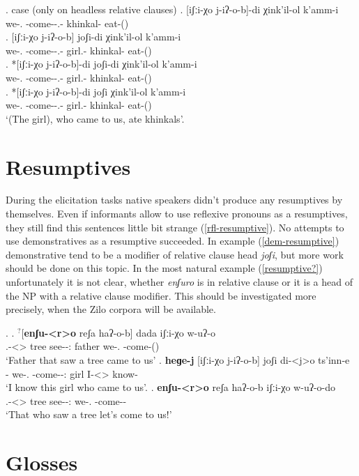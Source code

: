 \ex. case (only on headless relative clauses)
	\ag. [iʃːi-χo j-iʔ-o-b]-di χink'il-ol k'amm-i\\
			{we-\Add.\Lat} {\M-come-\Pst-\Ptcp.\Pst-\Erg} {khinkal-\Pl} {eat-\Pst(\Aor)}\\
	\bg. [iʃːi-χo j-iʔ-o-b] joʃi-di χink'il-ol k'amm-i\\
			{we-\Add.\Lat} {\M-come-\Pst-\Ptcp.\Pst-\Erg} {girl.\Obl-\Erg} {khinkal-\Pl} {eat-\Pst(\Aor)}\\
	\bg. *[iʃːi-χo j-iʔ-o-b]-di joʃi-di χink'il-ol k'amm-i\\
			{we-\Add.\Lat} {\M-come-\Pst-\Ptcp.\Pst-\Erg} {girl.\Obl-\Erg} {khinkal-\Pl} {eat-\Pst(\Aor)}\\
	\bg. *[iʃːi-χo j-iʔ-o-b]-di joʃi χink'il-ol k'amm-i\\
			{we-\Add.\Lat} {\M-come-\Pst-\Ptcp.\Pst-\Erg} {girl.\Obl-\Erg} {khinkal-\Pl} {eat-\Pst(\Aor)}\\
			\glt `(The girl), who came to us, ate khinkals'.

\section{Resumptives}
During the elicitation tasks native speakers didn't produce any resumptives by themselves. Even if informants allow to use reflexive pronouns as a resumptives, they still find this sentences little bit strange (\ref{rfl-resumptive}). No attempts to use demonstratives as a resumptive succeeded. In example (\ref{dem-resumptive}) demonstrative tend to be a modifier of relative clause head \textit{joʃi}, but more work should be done on this topic. In the most natural example (\ref{resumptive?}) unfortunately it is not clear, whether \textit{enʃuro} is in relative clause or it is a head of the NP with a relative clause modifier. This should be investigated more precisely, when the Zilo corpora will be available.

\ex.  
	\ag. $^?$[\textbf{enʃu-<r>o} reʃa haʔ-o-b] dada iʃːi-χo w-uʔ-o\\
		{\Rfl.\Obl-<\Nans>\Aff} tree {see-\Pst-\Ptcp:\Pst} father {we-\Add.\Lat} {\M-come-\Pst(\Aor)}\\
		\glt `Father that saw a tree came to us' \label{rfl-resumptive}
	\bg. \textbf{heɡe-j} [iʃːi-χo j-iʔ-o-b] joʃi di-<j>o ts'inn-e\\
		{\Dem-\F} {we-\Add.\Lat} {\M-come-\Pst-\Ptcp:\Pst} girl {I-<\F>\Aff} {know-\Hab}\\
		\glt `I know this girl who came to us'. \label{dem-resumptive}
	\bg. \textbf{enʃu-<r>o} reʃa haʔ-o-b iʃːi-χo w-uʔ-o-do\\
		{\Rfl.\Obl-<\Nans>\Aff} tree {see-\Pst-\Ptcp:\Pst} {we-\Add.\Lat} {\M-come-\Imp-\Jus}\\
		\glt `That who saw a tree let's come to us!' \label{resumptive?}
 
\section*{Glosses}
\small
\printglosses


\normalsize
